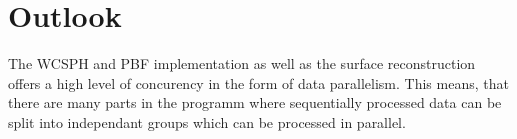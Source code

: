 \documentclass[11pt, letterpaper, twocolumn]{article}
\begin{document}


\section*{Outlook}
\label{sec:future}
The WCSPH and PBF implementation as well as the surface reconstruction offers a high level of concurency in the form of data parallelism. This means, that there are many parts in the programm where sequentially processed data can be split into independant groups which can be processed in parallel.





{\footnotesize
}



\end{document}
